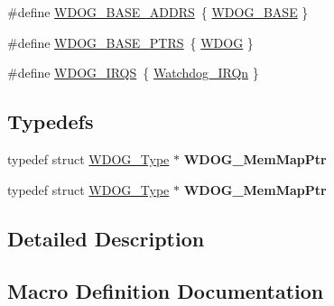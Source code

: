 \begin{DoxyCompactItemize}
\item 
\#define \hyperlink{group__WDOG__Peripheral__Access__Layer_gaa48c10a6a132d044b0d2a7b495b303da}{W\+D\+O\+G\+\_\+\+B\+A\+S\+E\+\_\+\+A\+D\+D\+RS}~\{ \hyperlink{group__WDOG__Peripheral__Access__Layer_ga0c092d77d4599871d1ebda1a3a28e887}{W\+D\+O\+G\+\_\+\+B\+A\+SE} \}
\item 
\#define \hyperlink{group__WDOG__Peripheral__Access__Layer_ga8d50dba3756857eed1783b3d726d40d8}{W\+D\+O\+G\+\_\+\+B\+A\+S\+E\+\_\+\+P\+T\+RS}~\{ \hyperlink{group__WDOG__Peripheral__Access__Layer_gab938901a5fa5443253fc293ebd0399e3}{W\+D\+OG} \}
\item 
\#define \hyperlink{group__WDOG__Peripheral__Access__Layer_gad44cf9ab5d5c2116869c5570758d4eeb}{W\+D\+O\+G\+\_\+\+I\+R\+QS}~\{ \hyperlink{group__Interrupt__vector__numbers_gga666eb0caeb12ec0e281415592ae89083a3f04766f3177f0152623a86e39ccef06}{Watchdog\+\_\+\+I\+R\+Qn} \}
\end{DoxyCompactItemize}
\subsection*{Typedefs}
\begin{DoxyCompactItemize}
\item 
typedef struct \hyperlink{structWDOG__Type}{W\+D\+O\+G\+\_\+\+Type} $\ast$ {\bfseries W\+D\+O\+G\+\_\+\+Mem\+Map\+Ptr}\hypertarget{group__WDOG__Peripheral__Access__Layer_ga2ede0926c93f1cde46423a386bfdcaa2}{}\label{group__WDOG__Peripheral__Access__Layer_ga2ede0926c93f1cde46423a386bfdcaa2}

\item 
typedef struct \hyperlink{structWDOG__Type}{W\+D\+O\+G\+\_\+\+Type} $\ast$ {\bfseries W\+D\+O\+G\+\_\+\+Mem\+Map\+Ptr}\hypertarget{group__WDOG__Peripheral__Access__Layer_ga2ede0926c93f1cde46423a386bfdcaa2}{}\label{group__WDOG__Peripheral__Access__Layer_ga2ede0926c93f1cde46423a386bfdcaa2}

\end{DoxyCompactItemize}


\subsection{Detailed Description}


\subsection{Macro Definition Documentation}

